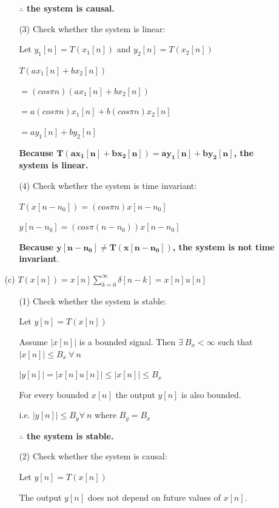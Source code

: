 \documentclass[fleqn]{article}
\begin{document}
\begin{enumerate}[nolistsep]
\begin{enumerate}[nolistsep]
\begin{enumerate}[nolistsep]
					\textbf{$\mathbf{\therefore}$ the system is causal.}
					
					\item[(3)] Check whether the system is linear:
					
					Let $y_1[n] = T(x_1[n])$ and $y_2[n] = T(x_2[n])$
					
					$T(ax_1[n] + bx_2[n])$
					
					$ = (cos{\pi}n)(ax_1[n] + bx_2[n])$
					
					$ = a(cos{\pi}n)x_1[n] + b(cos{\pi}n)x_2[n]$
					
					$ = ay_1[n] + by_2[n]$
					
					\textbf{Because $\mathbf{T(ax_1[n] + bx_2[n]) = ay_1[n] + by_2[n]}$, the system is linear.}
					
					\item[(4)] Check whether the system is time invariant:
					
					$T(x[n-n_0]) = (cos{\pi}n)x[n-n_0]$
					
					$y[n-n_0] = (cos{\pi}(n-n_0))x[n-n_0]$
					
					\textbf{Because $\mathbf{y[n-n_0] \neq T(x[n-n_0])}$, the system is not time invariant}.
				\end{enumerate}
					
				\item[(c)] $T(x[n]) = x[n]\sum_{k=0}^{\infty}{\delta[n-k]} = x[n]u[n]$
					
				\begin{enumerate}[nolistsep]
					\item[(1)] Check whether the system is stable:
			
					Let $y[n] = T(x[n])$
			
					Assume $|x[n]|$ is a bounded signal. Then $\exists\ B_x < \infty$ such that  $|x[n]| \leq B_x\ \forall\ n$
			
					$|y[n]| = |x[n]u[n]| \leq |x[n]| \leq B_x$
			
					For every bounded $x[n]$ the output $y[n]$ is also bounded.
			
					i.e. $|y[n]| \leq B_y \forall\ n$ where $B_y = B_x$
					
					\textbf{$\mathbf{\therefore}$ the system is stable.}
					
					\item[(2)] Check whether the system is causal:
					
					Let $y[n] = T(x[n])$
					
					The output $y[n]$ does not depend on future values of $x[n]$.
					

\end{enumerate}
\end{enumerate}
\end{enumerate}
\end{document}

